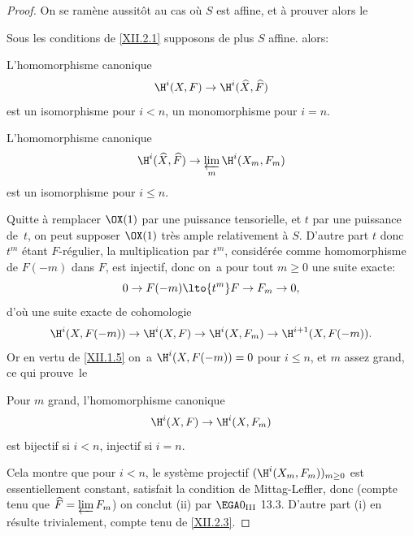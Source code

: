 \begin{proof}
On se ram\`ene aussit\^{o}t au cas o\`u $S$ est affine, et \`a prouver alors le

\begin{corollaire} \label{XII.2.2}
Sous les conditions de \ref{XII.2.1} supposons de plus $S$ affine. alors:
\begin{enumeratei}
\item
L'homomorphisme canonique
\[
\H^i(X, F) \to \H^i(\widehat{X}, \widehat{F})
\]
est un isomorphisme pour $i<n$, un monomorphisme pour $i=n$.
\item
L'homomorphisme canonique
\[
\H^i(\widehat{X}, \widehat{F}) \to \varprojlim_m \H^i(X_m, F_m)
\]
est un isomorphisme pour $i\leq n$.
\end{enumeratei}
\end{corollaire}

Quitte \`a remplacer $\OX(1)$ par une puissance tensorielle, et $t$ par une puissance de~$t$, on peut supposer $\OX(1)$ tr\`es ample relativement \`a $S$. D'autre part $t$ donc $t^m$ \'etant $F$-r\'egulier, la multiplication par $t^m$, consid\'er\'ee comme homomorphisme de $F(-m)$ dans $F$, est injectif, donc on~a pour tout $m\geq 0$ une suite exacte:
\steco
\begin{equation} \label{eq:XII.14}
0\to F(-m) \lto{t^m} F \to F_m \to0,
\end{equation}
d'o\`u une suite exacte de cohomologie
\[
\H^i(X, F(-m)) \to \H^i(X, F) \to \H^i(X, F_m) \to \H^{i+1}(X, F(-m)).
\]
Or en vertu de \ref{XII.1.5} on~a $\H^i(X, F(-m))=0$ pour $i\leq n$, et $m$ assez grand, ce qui prouve~le

\begin{lemme} \label{XII.2.3}
Pour $m$ grand, l'homomorphisme canonique
\[
\H^i(X, F) \to \H^i(X, F_m)
\]
est bijectif si $i<n$, injectif si $i=n$.
\end{lemme}

\enlargethispage{-2\baselineskip}%
Cela montre que pour $i<n$, le syst\`eme projectif $(\H^i(X_m, F_m))_{m\geq 0}$ est essentiellement constant, \afortiori satisfait la condition de Mittag-Leffler, donc (compte tenu que $\widehat{F}= \varprojlim F_m$) on conclut (ii) par $\EGA 0_{\textup{III}}$ 13.3. D'autre part (i) en r\'esulte trivialement, compte tenu de \ref{XII.2.3}.


\end{proof}
